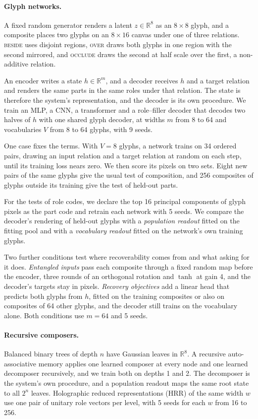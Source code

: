 \documentclass[10pt]{article}
\theoremstyle{plain}
\theoremstyle{remark}
\newcommand{\R}{\mathbb{R}}
\begin{document}
\paragraph{Glyph networks.} A fixed random generator renders a latent $z \in \R^{8}$ as an $8 \times 8$ glyph, and a composite places two glyphs on an $8 \times 16$ canvas under one of three relations. \textsc{beside} uses disjoint regions, \textsc{over} draws both glyphs in one region with the second mirrored, and \textsc{occlude} draws the second at half scale over the first, a non-additive relation.

An encoder writes a state $h \in \R^m$, and a decoder receives $h$ and a target relation and renders the same parts in the same roles under that relation. The state is therefore the system's representation, and the decoder is its own procedure. We train an MLP, a CNN, a transformer and a role--filler decoder that decodes two halves of $h$ with one shared glyph decoder, at widths $m$ from 8 to 64 and vocabularies $V$ from 8 to 64 glyphs, with 9 seeds.

One case fixes the terms. With $V = 8$ glyphs, a network trains on 34 ordered pairs, drawing an input relation and a target relation at random on each step, until its training loss nears zero. We then score its pixels on two sets. Eight new pairs of the same glyphs give the usual test of composition, and 256 composites of glyphs outside its training give the test of held-out parts.

For the tests of role codes, we declare the top 16 principal components of glyph pixels as the part code and retrain each network with 5 seeds. We compare the decoder's rendering of held-out glyphs with a \emph{population readout} fitted on the fitting pool and with a \emph{vocabulary readout} fitted on the network's own training glyphs.

Two further conditions test where recoverability comes from and what asking for it does. \emph{Entangled inputs} pass each composite through a fixed random map before the encoder, three rounds of an orthogonal rotation and $\tanh$ at gain 4, and the decoder's targets stay in pixels. \emph{Recovery objectives} add a linear head that predicts both glyphs from $h$, fitted on the training composites or also on composites of 64 other glyphs, and the decoder still trains on the vocabulary alone. Both conditions use $m = 64$ and 5 seeds.

\paragraph{Recursive composers.} Balanced binary trees of depth $n$ have Gaussian leaves in $\R^8$. A recursive auto-associative memory \citep{pollack1990} applies one learned composer at every node and one learned decomposer recursively, and we train both on depths 1 and 2. The decomposer is the system's own procedure, and a population readout maps the same root state to all $2^n$ leaves. Holographic reduced representations (HRR) of the same width $w$ use one pair of unitary role vectors per level, with 5 seeds for each $w$ from 16 to 256.
\end{document}
